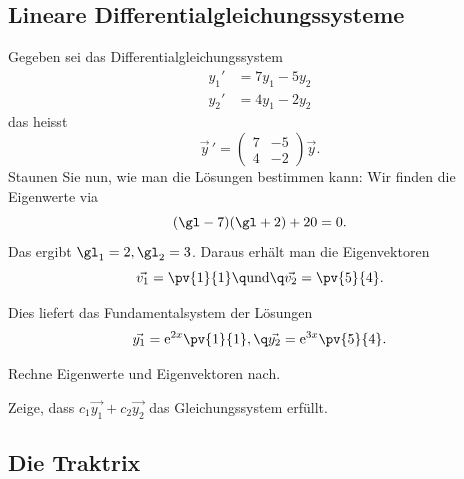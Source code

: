 \documentclass[%
11pt,%
twoside,%
titlepage,%
german,%
headsepline%
]{scrartcl}
\begin{document}
\subsection{Lineare Differentialgleichungssysteme}

\begin{bsp}
Gegeben sei das Differentialgleichungssystem
\begin{align*}
y_1'&=7y_1-5y_2\\
y_2'&=4y_1-2y_2
\end{align*}
das heisst
$$\vec{y}\,'=
\begin{pmatrix}
7 & -5\\
4 & -2
\end{pmatrix}
\vec{y}.$$
Staunen Sie nun, wie man die L\"osungen bestimmen kann:
Wir finden die Eigenwerte via
$$(\gl-7)(\gl+2)+20=0.$$
Das ergibt $\gl_1=2, \gl_2=3$. Daraus erh\"alt man die Eigenvektoren
$$\vec{v_1}=\pv{1}{1}\q\text{und}\q\vec{v_2}=\pv{5}{4}.$$

Dies liefert das Fundamentalsystem der L\"osungen
$$\vec{y_1}=\mathrm{e}^{2x}\pv{1}{1},\q\vec{y_2}=\mathrm{e}^{3x}\pv{5}{4}.$$
\end{bsp}

\begin{ueb}
Rechne Eigenwerte und Eigenvektoren nach.
\end{ueb}


\begin{ueb}
Zeige, dass $c_1\vec{y_1}+c_2\vec{y_2}$ das Gleichungssystem erfüllt.
\end{ueb}

\subsection{Die Traktrix}
\end{document}
